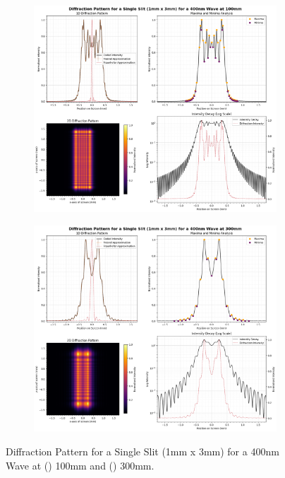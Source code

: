 \documentclass[12pt]{article}
\begin{document}
\begin{figure}[H]
    \centering
    \begin{subfigure}[b]{.48\textwidth}
        \centering
        \includegraphics[width=\linewidth]{vsslit_400nm_100mm.png}
        \label{fig:8a}
    \end{subfigure}
    \hspace{-.5em}
    \begin{subfigure}[b]{.48\textwidth}
        \centering
        \includegraphics[width=\linewidth]{vsslit_400nm_300mm.png}
        \label{fig:8b}
    \end{subfigure}
    \caption{Diffraction Pattern for a Single Slit (1mm x 3mm) for a 400nm Wave at () 100mm and () 300mm.}
    \label{fig:8}
\end{figure}
\end{document}
